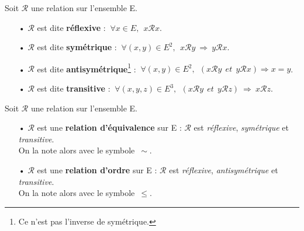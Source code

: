 \noindent
Soit \(\mathcal{R}\) une relation sur l'ensemble E.
\vspace{0.1cm}
\begin{itemize}
    \item[•] \(\mathcal{R}\) est dite \textbf{réflexive} \ssi : \(\ \forall x \in E,\ \ x\mathcal{R}x\).\vspace{0.1cm}
    
    \item[•] \(\mathcal{R}\) est dite \textbf{symétrique} \ssi : \(\ \forall(x,y)\in E^2,\ \  x\mathcal{R}y \ \Rightarrow \ y\mathcal{R}x\).\vspace{0.1cm}
    
     \item[•] \(\mathcal{R}\) est dite \textbf{antisymétrique}\footnote{Ce n'est pas l'inverse de symétrique.} \ssi : \(\ \forall(x,y)\in E^2,\ \  \left( x\mathcal{R}y\ \ et\ \ y\mathcal{R}x \right) \Rightarrow x=y\).\vspace{0.1cm}
     
     \item[•] \(\mathcal{R}\) est dite \textbf{transitive} \ssi : \(\ \forall(x,y,z)\in E^3,\ \  \left( x\mathcal{R}y\ \ et\ \ y\mathcal{R}z \right)\ \Rightarrow\ x\mathcal{R}z\).
\end{itemize}

\vspace{0.8cm}

\noindent
Soit \(\mathcal{R}\) une relation sur l'ensemble E.
\begin{itemize}[leftmargin=0cm]
    \item[•] \(\mathcal{R}\) est une \textbf{relation d'équivalence} sur E \ssi : \(\mathcal{R}\) est \emph{réflexive}, \emph{symétrique} et \emph{transitive}. \\
    On la note alors avec le symbole \(\, \sim\).\vspace{0.1cm}
    
    \item[•] \(\mathcal{R}\) est une \textbf{relation d'ordre} sur E \ssi : \(\mathcal{R}\) est \emph{réflexive}, \emph{antisymétrique} et \emph{transitive}. \\
    On la note alors avec le symbole \(\, \leq\).
\end{itemize}

\vspace{1cm}

